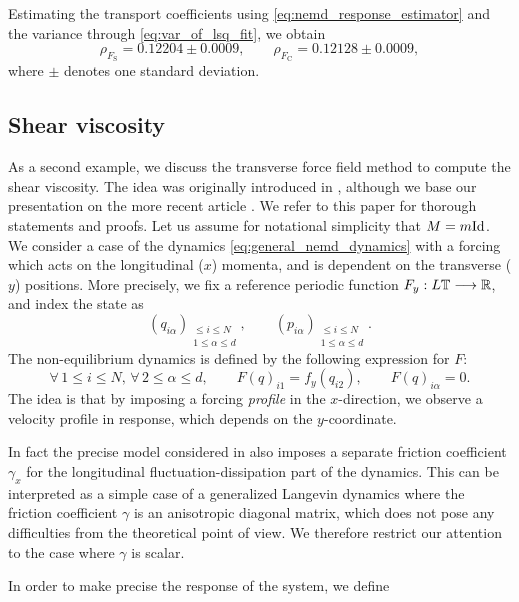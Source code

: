 Estimating the transport coefficients using \eqref{eq:nemd_response_estimator} and the variance through \eqref{eq:var_of_lsq_fit}, we obtain 
\begin{equation}
    \rho_{F_{\mathrm{S}}}=0.12204\pm0.0009,\qquad \rho_{F_{\mathrm{C}}}=0.12128\pm0.0009,
\end{equation}
where $\pm$ denotes one standard deviation.
\subsection{Shear viscosity}
As a second example, we discuss the transverse force field method to compute the shear viscosity. The idea was originally introduced in \cite{GMS73}, although we base our presentation on the more recent article \cite{JS12}.
We refer to this paper for thorough statements and proofs.
Let us assume for notational simplicity that $M=m\mathrm{Id}$.
We consider a case of the dynamics \eqref{eq:general_nemd_dynamics} with a forcing which acts on the longitudinal ($x$) momenta, and is dependent on the transverse ($y$) positions.
More precisely, we fix a reference periodic function $F_y:L\mathbb{T}\longrightarrow \mathbb{R}$,
and index the state as \[\left(q_{i\alpha}\right)_{\substack{\leq i\leq N\\1\leq \alpha\leq d}},\qquad \left(p_{i\alpha}\right)_{\substack{\leq i\leq N\\1\leq \alpha\leq d}}.\]
The non-equilibrium dynamics is defined by the following expression for $F$:
\begin{equation}
    \label{eq:shear_viscosity_forcing}
    \forall\, 1\leq i\leq N,\,\forall\, 2\leq \alpha\leq d,\qquad F(q)_{i1}=f_y(q_{i2}),\qquad F(q)_{i\alpha}=0.
\end{equation}
The idea is that by imposing a forcing \textit{profile} in the $x$-direction, we observe a velocity profile in response, which depends on the $y$-coordinate.
\begin{remark}
    In fact the precise model considered in \cite{JS12} also imposes a separate friction coefficient $\gamma_x$ for the longitudinal fluctuation-dissipation part of the dynamics.
    This can be interpreted as a simple case of a generalized Langevin dynamics where the friction coefficient $\gamma$ is an anisotropic diagonal matrix, which does not pose any difficulties from the theoretical point of view.
    We therefore restrict our attention to the case where $\gamma$ is scalar.
\end{remark}
In order to make precise the response of the system, we define
